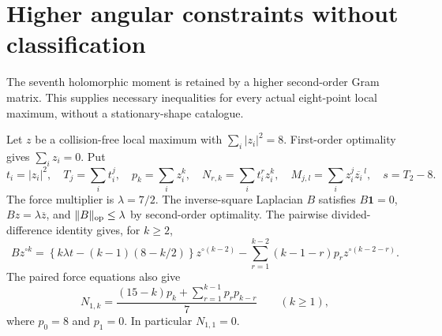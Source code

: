 \documentclass[11pt]{article}
\theoremstyle{remark}
\numberwithin{equation}{section}
\begin{document}
\section{Higher angular constraints without classification}
\label{sec:noclass-n8-higher}
The seventh holomorphic moment is retained by a higher second-order
Gram matrix. This supplies necessary inequalities for every actual
eight-point local maximum, without a stationary-shape catalogue.

Let $z$ be a collision-free local maximum with $\sum_i|z_i|^2=8$.
First-order optimality gives $\sum_i z_i=0$. Put
\[
 t_i=|z_i|^2,\quad T_j=\sum_i t_i^j,\quad
 p_k=\sum_i z_i^k,\quad N_{r,k}=\sum_i t_i^r z_i^k,\quad
 M_{j,l}=\sum_i z_i^j\overline{z_i}^{\,l},\quad s=T_2-8.
\]
The force multiplier is $\lambda=7/2$. The inverse-square Laplacian
$B$ satisfies $B\mathbf1=0$, $Bz=\lambda\overline z$, and
$\|B\|_{\rm op}\le\lambda$ by second-order optimality. The pairwise
divided-difference identity gives, for $k\ge2$,
\begin{equation}\label{eq:noclass-n8-B-recurrence}
 Bz^{\circ k}=
 \left\{k\lambda t-(k-1)(8-k/2)\right\}z^{\circ(k-2)}
 -\sum_{r=1}^{k-2}(k-1-r)p_rz^{\circ(k-2-r)}.
\end{equation}
The paired force equations also give
\begin{equation}\label{eq:noclass-n8-mixed}
 N_{1,k}=\frac{(15-k)p_k+\sum_{r=1}^{k-1}p_rp_{k-r}}7
 \qquad(k\ge1),
\end{equation}
where $p_0=8$ and $p_1=0$. In particular $N_{1,1}=0$.
\end{document}
